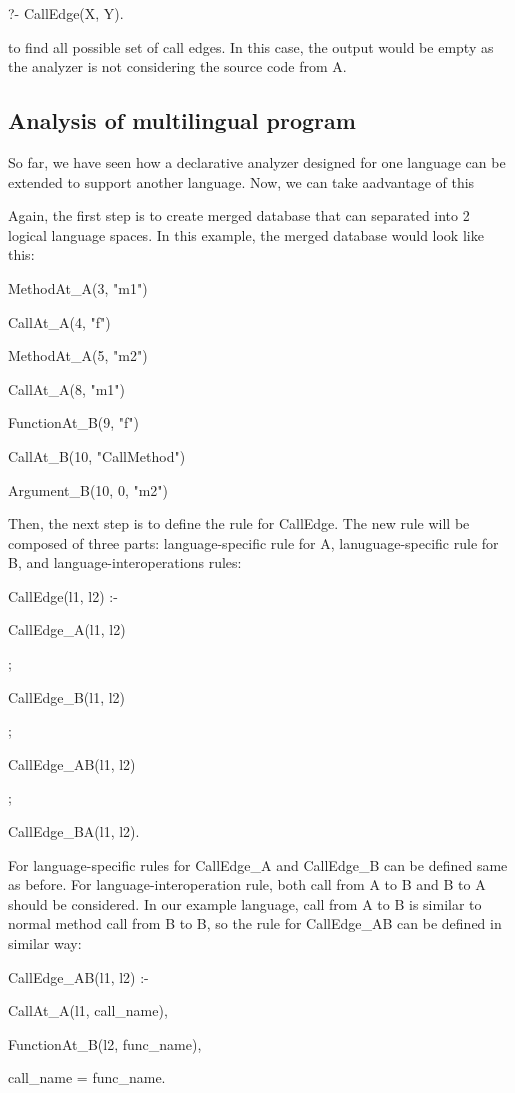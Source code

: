 ?- CallEdge(X, Y).

to find all possible set of call edges. In this case, the output would be empty
as the analyzer is not considering the source code from A.

\subsection{Analysis of multilingual program}
So far, we have seen how a declarative analyzer designed for one language can
be extended to support another language. Now, we can take aadvantage of this

Again, the first step is to create merged database that can separated into 2
logical language spaces. In this example, the merged database would look like
this:

MethodAt\_A(3, "m1")

CallAt\_A(4, "f")

MethodAt\_A(5, "m2")

CallAt\_A(8, "m1")

FunctionAt\_B(9, "f")

CallAt\_B(10, "CallMethod")

Argument\_B(10, 0, "m2")

Then, the next step is to define the rule for CallEdge.  The new rule will be
composed of three parts: language-specific rule for A, lanuguage-specific rule
for B, and language-interoperations rules:

CallEdge(l1, l2) :-

    CallEdge\_A(l1, l2)
    
    ;
    
    CallEdge\_B(l1, l2)

    ;

    CallEdge\_AB(l1, l2)

    ;

    CallEdge\_BA(l1, l2).

For language-specific rules for CallEdge\_A and CallEdge\_B can be defined same
as before.  For language-interoperation rule, both call from A to B and B to A
should be considered. In our example language, call from A to B is similar to
normal method call from B to B, so the rule for CallEdge\_AB can be defined in
similar way:

CallEdge\_AB(l1, l2) :-

    CallAt\_A(l1, call\_name),
    
    FunctionAt\_B(l2, func\_name),
    
    call\_name = func\_name.

